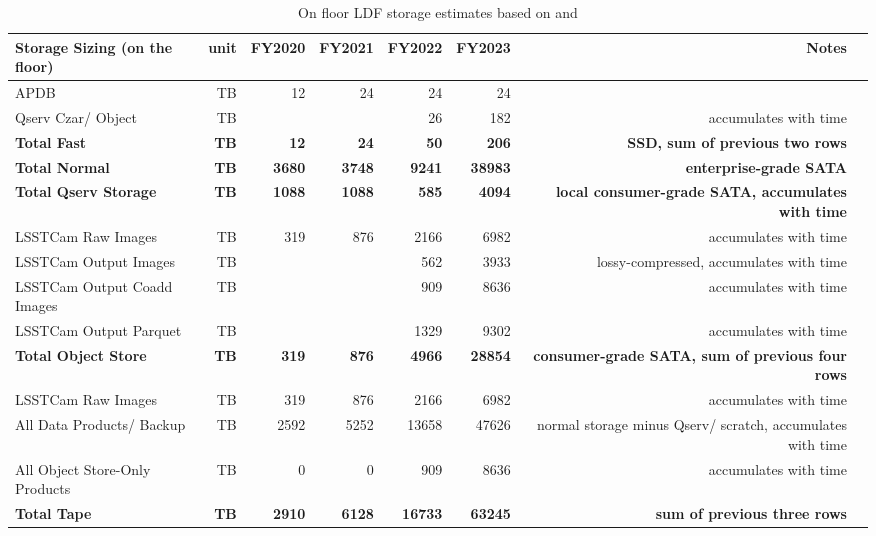 \tiny \begin{longtable} { |p{}  |r  |r  |r  |r  |r  |r  |r |} 
\caption{On floor LDF storage estimates based on  and 
 \label{tab:storageFloor}}\\ 
\hline 
\textbf{Storage Sizing (on the floor)}&\textbf{unit}&\textbf{FY2020}&\textbf{FY2021}&\textbf{FY2022}&\textbf{FY2023}&\textbf{Notes} \\ \hline
{APDB}&{TB}&{12}&{24}&{24}&{24}& \\ \hline
{Qserv Czar/ Object}&{TB}&{}&{}&{26}&{182}&{accumulates with time} \\ \hline
\textbf{Total Fast}&\textbf{TB}&\textbf{12}&\textbf{24}&\textbf{50}&\textbf{206}&\textbf{SSD, sum of previous two rows} \\ \hline
\textbf{Total Normal}&\textbf{TB}&\textbf{3680}&\textbf{3748}&\textbf{9241}&\textbf{38983}&\textbf{enterprise-grade SATA} \\ \hline
\textbf{Total Qserv Storage}&\textbf{TB}&\textbf{1088}&\textbf{1088}&\textbf{585}&\textbf{4094}&\textbf{local consumer-grade SATA, accumulates with time} \\ \hline
{LSSTCam Raw Images}&{TB}&{319}&{876}&{2166}&{6982}&{accumulates with time} \\ \hline
{LSSTCam Output Images}&{TB}&{}&{}&{562}&{3933}&{lossy-compressed, accumulates with time} \\ \hline
{LSSTCam Output Coadd Images}&{TB}&{}&{}&{909}&{8636}&{accumulates with time} \\ \hline
{LSSTCam Output Parquet}&{TB}&{}&{}&{1329}&{9302}&{accumulates with time} \\ \hline
\textbf{Total Object Store}&\textbf{TB}&\textbf{319}&\textbf{876}&\textbf{4966}&\textbf{28854}&\textbf{consumer-grade SATA, sum of previous four rows} \\ \hline
{LSSTCam Raw Images}&{TB}&{319}&{876}&{2166}&{6982}&{accumulates with time} \\ \hline
{All Data Products/ Backup}&{TB}&{2592}&{5252}&{13658}&{47626}&{normal storage minus Qserv/ scratch, accumulates with time} \\ \hline
{All Object Store-Only Products}&{TB}&{0}&{0}&{909}&{8636}&{accumulates with time} \\ \hline
\textbf{Total Tape}&\textbf{TB}&\textbf{2910}&\textbf{6128}&\textbf{16733}&\textbf{63245}&\textbf{sum of previous three rows} \\ \hline
\end{longtable} \normalsize
